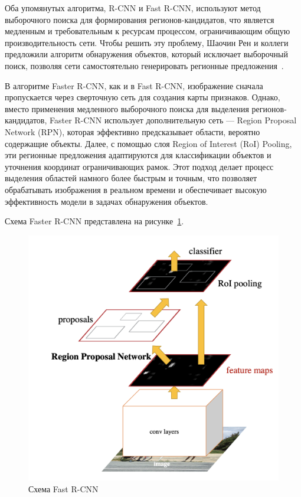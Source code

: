 Оба упомянутых алгоритма, R-CNN и Fast R-CNN, используют метод выборочного поиска для формирования регионов-кандидатов, что является медленным и требовательным к ресурсам процессом, ограничивающим общую производительность сети. Чтобы решить эту проблему, Шаочин Рен и коллеги предложили алгоритм обнаружения объектов, который исключает выборочный поиск, позволяя сети самостоятельно генерировать регионные предложения~\cite{faster_r-cnn}.

В алгоритме Faster R-CNN, как и в Fast R-CNN, изображение сначала пропускается через сверточную сеть для создания карты признаков. Однако, вместо применения медленного выборочного поиска для выделения регионов-кандидатов, Faster R-CNN использует дополнительную сеть — Region Proposal Network (RPN), которая эффективно предсказывает области, вероятно содержащие объекты. Далее, с помощью слоя Region of Interest (RoI) Pooling, эти регионные предложения адаптируются для классификации объектов и уточнения координат ограничивающих рамок. Этот подход делает процесс выделения областей намного более быстрым и точным, что позволяет обрабатывать изображения в реальном времени и обеспечивает высокую эффективность модели в задачах обнаружения объектов.

Схема Faster R-CNN представлена на рисунке~\ref{faster_r-cnn_sheme}.

\begin{figure}[H]
    \centering
    \includegraphics[width=0.8\linewidth]{images/faster_r-cnn.png}
    \caption{Схема Fast R-CNN}
    \label{faster_r-cnn_sheme}
\end{figure}


